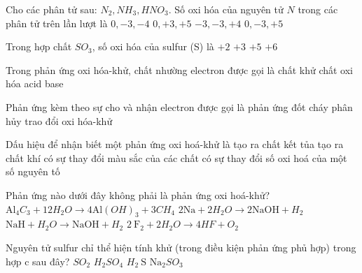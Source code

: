 \begin{ex}Cho các phân tử sau: $N_2, NH_3, HNO_3$. Số oxi hóa của nguyên tử $N$ trong các phân tử trên lần lượt là
	\choice
	{$0,-3,-4$}
	{$0,+3,+5$}
	{$-3,-3,+4$}
	{\True $0,-3,+5$}
	\loigiai{}
\end{ex}

\begin{ex}Trong hợp chất $SO_3$, số oxi hóa của sulfur (S) là
	\choice
	{$+2$}
	{$+3$}
	{$+5$}
	{\True $+6$}
	\loigiai{}
\end{ex}

\begin{ex}Trong phản ứng oxi hóa-khử, chất nhường electron được gọi là
	\choice
	{\True chất khử}
	{chất oxi hóa}
	{acid}
	{base}
	\loigiai{}
\end{ex}

\begin{ex}Phản ứng kèm theo sự cho và nhận electron được gọi là phản ứng
	\choice
	{đốt cháy}
	{phân hủy}
	{trao đổi}
	{\True oxi hóa-khử}
	\loigiai{}
\end{ex}

\begin{ex}Dấu hiệu để nhận biết một phản ứng oxi hoá-khử là
	\choice
	{tạo ra chất kết tủa}
	{tạo ra chất khí}
	{có sự thay đổi màu sắc của các chất}
	{\True có sự thay đổi số oxi hoá của một số nguyên tố}
	\loigiai{}
\end{ex}

\begin{ex}Phản ứng nào dưới đây không phải là phản ứng oxi hoá-khử?
	\choice
	{\True $\mathrm{Al}_4C_3+12H_2O\to 4\mathrm{Al}(OH)_3+3CH_4$}
	{$2\mathrm{Na}+2H_2O\to 2\mathrm{NaOH}+H_2$}
	{$\mathrm{NaH}+H_2O\to \mathrm{NaOH}+H_2$}
	{$2\mathrm{~F}_2+2H_2O\to 4HF+O_2$}
	\loigiai{}
\end{ex}

\begin{ex}Nguyên tử sulfur chỉ thể hiện tính khử (trong điều kiện phản ứng phủ hợp) trong hợp c sau đây?
	\choice
	{\True $SO_2$}
	{$H_2SO_4$}
	{$H_2\mathrm{~S}$}
	{$\mathrm{Na}_2SO_3$}
	\loigiai{}
\end{ex}

